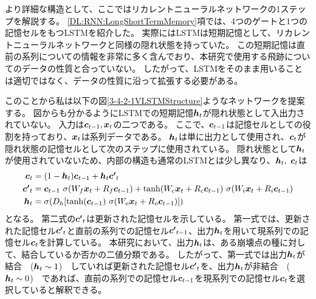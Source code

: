 より詳細な構造として、ここではリカレントニューラルネットワークの1ステップを解説する。
\ref{DL:RNN:LongShortTermMemory}項では、4つのゲートと1つの記憶セルをもつLSTMを紹介した。
実際にはLSTMは短期記憶として、リカレントニューラルネットワークと同様の隠れ状態を持っていた。
この短期記憶は直前の系列についての情報を非常に多く含んでおり、本研究で使用する飛跡についてのデータの性質と合っていない。
したがって、LSTMをそのまま用いることは適切ではなく、データの性質に沿って拡張する必要がある。

このことから私は以下の図\ref{3-4-2-1VLSTMStructure}ようなネットワークを提案する。
図からも分かるようにLSTMでの短期記憶${\mbox{\boldmath{$h$}}}_t$が隠れ状態として入出力されていない。
入力は${\mbox{\boldmath{$c$}}}_{t-1},{\mbox{\boldmath{$x$}}}_t$の二つである。
ここで、${\mbox{\boldmath{$c$}}}_{t-1}$は記憶セルとしての役割を持っており、${\mbox{\boldmath{$x$}}}_t$は系列データである。
${\mbox{\boldmath{$h$}}}_t$は単に出力として使用され、${\mbox{\boldmath{$c$}}}_{t}$が隠れ状態の記憶セルとして次のステップに使用されている。
隠れ状態として${\mbox{\boldmath{$h$}}}_t$が使用されていないため、内部の構造も通常のLSTMとは少し異なり、${\mbox{\boldmath{$h$}}}_{t},\  {\mbox{\boldmath{$c$}}}_{t}$は
\begin{equation}
 \begin{split}
  {\mbox{\boldmath{$c$}}}_{t} 
  &= (1-{\mbox{\boldmath{$h$}}}_t) {\mbox{\boldmath{$c$}}}_{t-1} + {\mbox{\boldmath{$h$}}}_t {\mbox{\boldmath{$c'$}}}_{t}\\
  {\mbox{\boldmath{$c'$}}}_{t}
  &= {\mbox{\boldmath{$c$}}}_{t-1} \  \sigma (W_f {\mbox{\boldmath{$x$}}}_t + R_f {\mbox{\boldmath{$c$}}}_{t-1}) 
  + \tanh (W_c {\mbox{\boldmath{$x$}}}_t + R_c {\mbox{\boldmath{$c$}}}_{t-1}) \  \sigma (W_i {\mbox{\boldmath{$x$}}}_t + R_i {\mbox{\boldmath{$c$}}}_{t-1})\\
  {\mbox{\boldmath{$h$}}}_{t} 
  &= \sigma (D_h [\tanh({\mbox{\boldmath{$c$}}}_{t-1}) \  \sigma (W_o {\mbox{\boldmath{$x$}}}_t + R_o {\mbox{\boldmath{$c$}}}_{t-1}) ])
 \end{split}
\end{equation}
となる。
第二式の${\mbox{\boldmath{$c'$}}}_{t}$は更新された記憶セルを示している。
第一式では、更新された記憶セル${\mbox{\boldmath{$c'$}}}_{t}$と直前の系列での記憶セル${\mbox{\boldmath{$c'$}}}_{t-1}$、出力${\mbox{\boldmath{$h$}}}_{t}$を用いて現系列での記憶セル${\mbox{\boldmath{$c$}}}_{t}$を計算している。
本研究において、出力${\mbox{\boldmath{$h$}}}_{t}$は、ある崩壊点の種に対して、結合しているか否かの二値分類である。
したがって、第一式では出力${\mbox{\boldmath{$h$}}}_{t}$が結合　(${\mbox{\boldmath{$h$}}}_{t} \sim 1$)　していれば更新された記憶セル${\mbox{\boldmath{$c'$}}}_{t}$を、出力${\mbox{\boldmath{$h$}}}_{t}$が非結合　(${\mbox{\boldmath{$h$}}}_{t} \sim 0$)　であれば、直前の系列での記憶セル${\mbox{\boldmath{$c$}}}_{t-1}$を現系列での記憶セル${\mbox{\boldmath{$c$}}}_{t}$を選択していると解釈できる。
